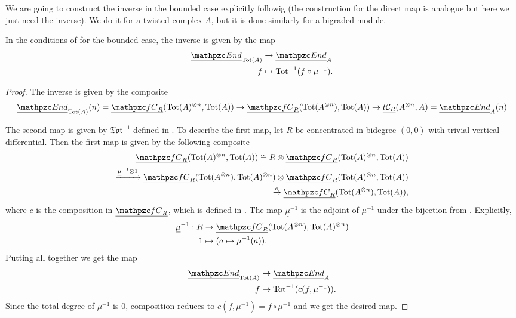 \documentclass[twoside]{article}
\begin{document}
We are going to construct the inverse in the bounded case explicitly followig  (the construction for the direct map is analogue but here we just need the inverse). We do it for a twisted complex $A$, but it is done similarly for a bigraded module.

\begin{lem}\label{composition}
In the conditions of  for the bounded case, the inverse is given by the map
\begin{align*}
\uEnd_{\Tot(A)}&\to\uEnd_A\\
f & \mapsto \Tot^{-1}(f\circ \mu^{-1}).
\end{align*}
\end{lem}
\begin{proof}
The inverse is given by the composite
\[\uEnd_{\Tot(A)}(n)=\ufC(\Tot(A)^{\otimes n},\Tot(A))\to \ufC(\Tot(A^{\otimes n}),\Tot(A))\to\utC(A^{\otimes n},A)=\uEnd_A(n) \]

The second map is given by $\mathfrak{Tot}^{-1}$ defined in . To describe the first map, let $R$ be concentrated in bidegree $(0,0)$ with trivial vertical differential. Then the first map is given by the following composite
\begin{align*}
\ufC(\Tot(A)^{\otimes n},\Tot(A))\cong R\otimes\ufC(\Tot(A)^{\otimes n},\Tot(A))\\
\xrightarrow{\underline{\mu}^{-1}\otimes 1}\ufC(\Tot(A^{\otimes n}),\Tot(A)^{\otimes n})\otimes\ufC(\Tot(A)^{\otimes n},\Tot(A))\\
\xrightarrow{c}\ufC(\Tot(A^{\otimes n}),\Tot(A)), 
\end{align*}
where $c$ is the composition in $\ufC$, which is defined in . The map $\underline{\mu}^{-1}$ is the adjoint of $\mu^{-1}$ under the bijection from . Explicitly,
\begin{align*}
\underline{\mu}^{-1}:R &\to \ufC(\Tot(A^{\otimes n}),\Tot(A)^{\otimes n})\\
1 &\mapsto (a\mapsto \mu^{-1}(a)).
\end{align*}
Putting all together we get the map 
\begin{align*}
\uEnd_{\Tot(A)}&\to\uEnd_A\\
f & \mapsto \Tot^{-1}(c(f, \mu^{-1})).
\end{align*}
Since the total degree of $\mu^{-1}$ is 0, composition reduces to $c(f,\mu^{-1})=f\circ \mu^{-1}$ and we get the desired map.
\end{proof}
\end{document}
